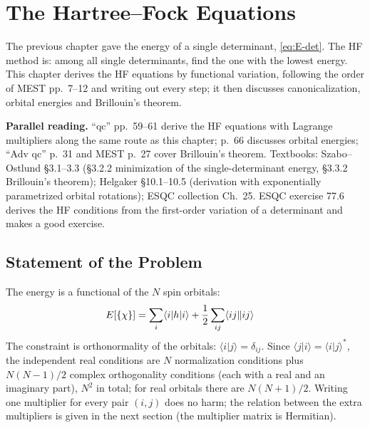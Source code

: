 \chapter{The Hartree--Fock Equations}
\label{ch:hf}

The previous chapter gave the energy of a single determinant, \eqref{eq:E-det}. The HF method is: among all single determinants, find the one with the lowest energy. This chapter derives the HF equations by functional variation, following the order of MEST pp.~7--12 and writing out every step; it then discusses canonicalization, orbital energies and Brillouin's theorem.

\textbf{Parallel reading.} “qc” pp.~59--61 derive the HF equations with Lagrange multipliers along the same route as this chapter; p.~66 discusses orbital energies; “Adv qc” p.~31 and MEST p.~27 cover Brillouin's theorem. Textbooks: Szabo--Ostlund §3.1--3.3 (§3.2.2 minimization of the single-determinant energy, §3.3.2 Brillouin's theorem); Helgaker §10.1--10.5 (derivation with exponentially parametrized orbital rotations); ESQC collection Ch.~25. ESQC exercise 77.6 derives the HF conditions from the first-order variation of a determinant and makes a good exercise.

\section{Statement of the Problem}

The energy is a functional of the $N$ spin orbitals:
\begin{align*}
E[\{\chi\}] &= \sum_i \langle i|h|i\rangle + \frac{1}{2} \sum_{ij} \langle ij\Vert ij\rangle
\end{align*}
The constraint is orthonormality of the orbitals: $\langle i | j \rangle = \delta_{ij}$. Since $\langle j|i\rangle = \langle i|j\rangle^*$, the independent real conditions are $N$ normalization conditions plus $N(N-1)/2$ complex orthogonality conditions (each with a real and an imaginary part), $N^2$ in total; for real orbitals there are $N(N+1)/2$. Writing one multiplier for every pair $(i, j)$ does no harm; the relation between the extra multipliers is given in the next section (the multiplier matrix is Hermitian).

